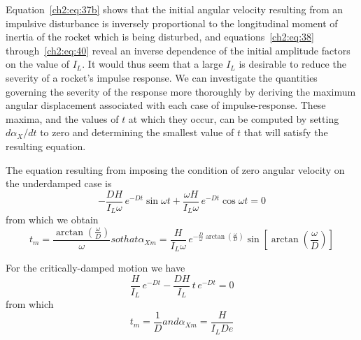 Equation~\eqref{ch2:eq:37b} shows that the initial angular velocity resulting
from an impulsive disturbance is inversely proportional to the longitudinal
moment of inertia of the rocket which is being disturbed, and
equations~\eqref{ch2:eq:38} through~\eqref{ch2:eq:40} reveal an inverse
dependence of the initial amplitude factors on the value of $I_L$. It would
thus seem that a large $I_L$ is desirable to reduce the severity of a rocket's
impulse response. We can investigate the quantities governing the severity of
the response more thoroughly by deriving the maximum angular displacement
associated with each case of impulse-response. These maxima, and the values of
$t$ at which they occur, can be computed by setting $d\alpha_X/dt$ to zero and
determining the smallest value of $t$ that will satisfy the resulting equation.

The equation resulting from imposing the condition of zero angular velocity on
the underdamped case is
\begin{equation*}
-\frac{DH}{I_L\omega}\, e^{-Dt}\sin\omega t
+ \frac{\omega H}{I_L\omega}\, e^{-Dt}\cos\omega t = 0
\end{equation*}
from which we obtain
\begin{subequations}\label{ch2:eq:41}
\begin{equation}\label{ch2:eq:41a}
t_m = \frac{\arctan\left(\frac{\omega}{D}\right)}{\omega}
\end{equation}
so that
\begin{equation}\label{ch2:eq:41b}
\alpha_{Xm} = \frac{H}{I_L\omega}\,
e^{-\frac{D}{\omega}\arctan\left(\frac{\omega}{D}\right)}
\sin\left[\arctan\left(\frac{\omega}{D}\right)\right]
\end{equation}
\end{subequations}

For the critically-damped motion we have
\begin{equation*}
\frac{H}{I_L}\, e^{-Dt} - \frac{DH}{I_L}\, t\, e^{-Dt} = 0
\end{equation*}
from which
\begin{subequations}\label{ch2:eq:42}
\begin{equation}\label{ch2:eq:42a}
t_m = \frac{1}{D}
\end{equation}
and
\begin{equation}\label{ch2:eq:42b}
\alpha_{Xm} = \frac{H}{I_L D e}
\end{equation}
\end{subequations}

